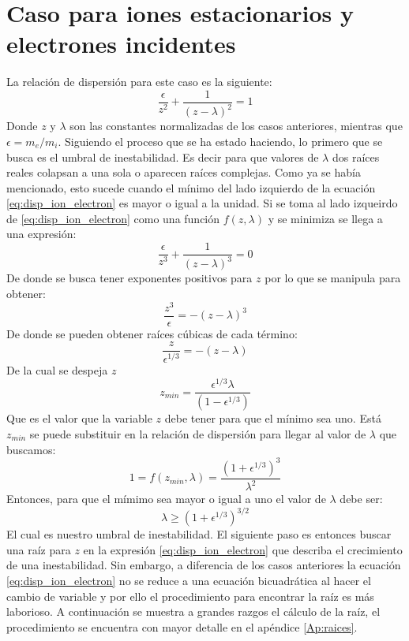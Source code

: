 \documentclass[../tesis_main_file.tex]{subfiles}
\begin{document}
\section{Caso para iones estacionarios y electrones incidentes}
La relación de dispersión para este caso es la siguiente:
\begin{equation}
\label{eq:disp_ion_electron}
\frac{\epsilon}{z^2}+\frac{1}{(z-\lambda)^2}=1
\end{equation}
Donde $z$ y $\lambda$ son las constantes normalizadas de los casos anteriores, mientras que $\epsilon = m_e/m_i$.
Siguiendo el proceso que se ha estado haciendo, lo primero que se busca es el umbral de inestabilidad. Es decir para que valores de $\lambda$ dos raíces reales colapsan a una sola o aparecen raíces complejas. Como ya se había mencionado, esto sucede cuando el mínimo del lado izquierdo de la ecuación \ref{eq:disp_ion_electron} es mayor o igual a la unidad. Si se toma al lado izqueirdo de \ref{eq:disp_ion_electron} como una función $f(z,\lambda)$ y se minimiza se llega a una expresión:
\begin{equation}
\frac{\epsilon}{z^3}+\frac{1}{(z-\lambda)^3}=0
\end{equation}
De donde se busca tener exponentes positivos para $z$ por lo que se manipula para obtener:
\begin{equation}
\frac{z^3}{\epsilon}=-(z-\lambda)^3
\end{equation}
De donde se pueden obtener raíces cúbicas de cada término:
\begin{equation}
\frac{z}{\epsilon ^{1/3}}=-(z-\lambda)
\end{equation}
De la cual se despeja $z$
\begin{equation}
z_{min}=\frac{\epsilon ^{1/3}\lambda}{(1- \epsilon^{1/3})}
\end{equation}
Que es el valor que la variable $z$ debe tener para que el mínimo sea uno. Está $z_{min}$ se puede substituir en la relación de dispersión para llegar al valor de $\lambda$ que buscamos:
\begin{equation}
1=f(z_{min},\lambda)=\frac{(1+\epsilon^{1/3})^3}{\lambda^2}
\end{equation}
Entonces, para que el mímimo sea mayor o igual a uno el valor de $\lambda$ debe ser:
\begin{equation}
\label{eq:umbral_ion_electron}
\lambda \geq (1+\epsilon^{1/3})^{3/2}
\end{equation}
El cual es nuestro umbral de inestabilidad.
El siguiente paso es entonces buscar una raíz para $z$ en la expresión \ref{eq:disp_ion_electron} que describa el crecimiento de una inestabilidad. Sin embargo, a diferencia de los casos anteriores la ecuación \ref{eq:disp_ion_electron} no se reduce a una ecuación bicuadrática al hacer el cambio de variable y por ello el procedimiento para encontrar la raíz es más laborioso. A continuación se muestra a grandes razgos el cálculo de la raíz, el procedimiento se encuentra con mayor detalle en el apéndice \ref{Ap:raices}.\\
\end{document}
